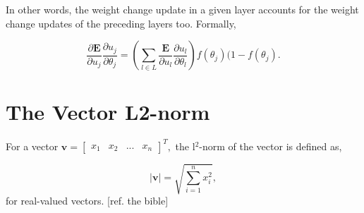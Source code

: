 In other words, the weight change update in a given layer accounts for the weight change updates of the preceding layers too. Formally,

\begin{equation}
    \frac{\partial \textbf{E}}{\partial u_j}\frac{\partial u_j}{\partial \theta_j} = 
    (\sum_{l \in L}\frac{\textbf{E}}{\partial u_l}\frac{\partial u_l}{\partial \theta_l}) f(\theta_j)(1-f(\theta_j).
\end{equation}


\section{The Vector L2-norm}\label{l2-norm}

For a vector
\begin{math}
    \textbf{v} = \begin{bmatrix} x_1 & x_2 & ... & x_n
        \end{bmatrix}^T,
\end{math}
the l$^2$-norm of the vector is defined as,

\begin{equation}
    |\textbf{v}| = \sqrt{\sum_{i=1}^{n} x_i^2},
\end{equation}
for real-valued vectors. [ref. the bible]